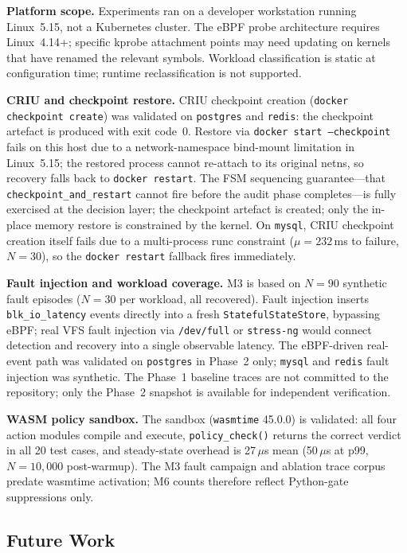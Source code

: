 \documentclass[conference]{IEEEtran}
\begin{document}
\textbf{Platform scope.} Experiments ran on a developer workstation running Linux~5.15, not a Kubernetes cluster. The eBPF probe architecture requires Linux~4.14+; specific kprobe attachment points may need updating on kernels that have renamed the relevant symbols. Workload classification is static at configuration time; runtime reclassification is not supported.

\textbf{CRIU and checkpoint restore.} CRIU checkpoint creation (\texttt{docker checkpoint create}) was validated on \texttt{postgres} and \texttt{redis}: the checkpoint artefact is produced with exit code~0. Restore via \texttt{docker start --checkpoint} fails on this host due to a network-namespace bind-mount limitation in Linux~5.15; the restored process cannot re-attach to its original netns, so recovery falls back to \texttt{docker restart}. The FSM sequencing guarantee---that \texttt{checkpoint\_and\_restart} cannot fire before the audit phase completes---is fully exercised at the decision layer; the checkpoint artefact is created; only the in-place memory restore is constrained by the kernel. On \texttt{mysql}, CRIU checkpoint creation itself fails due to a multi-process runc constraint ($\mu = 232$\,ms to failure, $N=30$), so the \texttt{docker restart} fallback fires immediately.

\textbf{Fault injection and workload coverage.} M3 is based on $N = 90$ synthetic fault episodes ($N = 30$ per workload, all recovered). Fault injection inserts \texttt{blk\_io\_latency} events directly into a fresh \texttt{StatefulStateStore}, bypassing eBPF; real VFS fault injection via \texttt{/dev/full} or \texttt{stress-ng} would connect detection and recovery into a single observable latency. The eBPF-driven real-event path was validated on \texttt{postgres} in Phase~2 only; \texttt{mysql} and \texttt{redis} fault injection was synthetic. The Phase~1 baseline traces are not committed to the repository; only the Phase~2 snapshot is available for independent verification.

\textbf{WASM policy sandbox.} The sandbox (\texttt{wasmtime} 45.0.0) is validated: all four action modules compile and execute, \texttt{policy\_check()} returns the correct verdict in all 20 test cases, and steady-state overhead is 27\,$\mu$s mean (50\,$\mu$s at p99, $N = 10{,}000$ post-warmup). The M3 fault campaign and ablation trace corpus predate wasmtime activation; M6 counts therefore reflect Python-gate suppressions only.

\subsection{Future Work}
\end{document}
